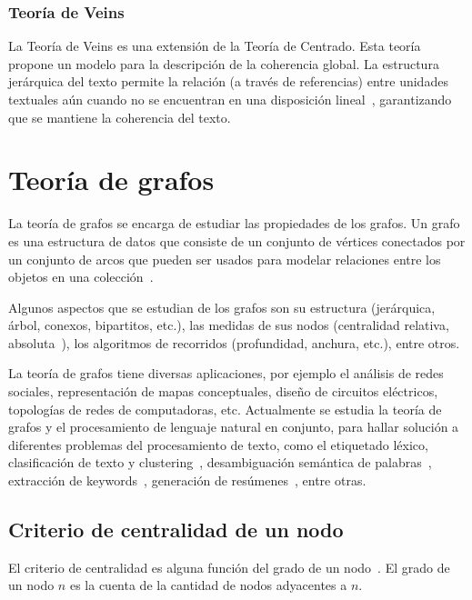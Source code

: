 \subsubsection{Teoría de Veins}
La Teoría de Veins es una extensión de la Teoría de Centrado. Esta teoría propone un modelo para la descripción de la coherencia global. La estructura jerárquica del texto permite la relación (a través de referencias) entre unidades textuales aún cuando no se encuentran en una disposición lineal~\cite{cristea2005motivations}, garantizando que se mantiene la coherencia del texto.

\section{Teoría de grafos}
La teoría de grafos se encarga de estudiar las propiedades de los grafos. Un grafo es una estructura de datos que consiste de un conjunto de vértices conectados por un conjunto de arcos que pueden ser usados para modelar relaciones entre los objetos en una colección~\cite{mihalcea2011graph}.

Algunos aspectos que se estudian de los grafos son su estructura (jerárquica, árbol, conexos, bipartitos, etc.), las medidas de sus nodos (centralidad relativa, absoluta~\cite{freeman1978centrality}), los algoritmos de recorridos (profundidad, anchura, etc.), entre otros.

La teoría de grafos tiene diversas aplicaciones, por ejemplo el análisis de redes sociales, representación de mapas conceptuales, diseño de circuitos eléctricos, topologías de redes de computadoras, etc. Actualmente se estudia la teoría de grafos y el procesamiento de lenguaje natural en conjunto, para hallar solución a diferentes problemas del procesamiento de texto, como el etiquetado léxico, clasificación de texto y clustering~\cite{mihalcea2011graph}, desambiguación semántica de palabras~\cite{MihalceaSinhaDisambiguation}\cite{ArabJahromiDisambiguation}, extracción de keywords~\cite{Litvak:2008:GKE:1613172.1613178}\cite{beliga2015overview}, generación de resúmenes~\cite{plaza2011uso}, entre otras.

\subsection{Criterio de centralidad de un nodo}
El criterio de centralidad es alguna función del grado de un nodo~\cite{freeman1978centrality}. El grado de un nodo $n$ es la cuenta de la cantidad de nodos adyacentes a $n$. 

